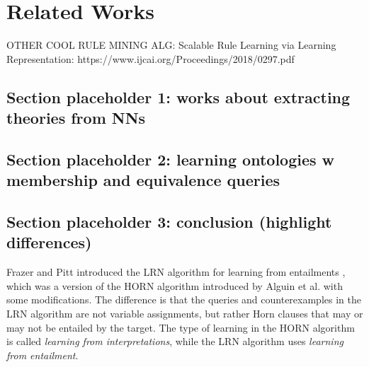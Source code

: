 \chapter{Related Works}

OTHER COOL RULE MINING ALG:
Scalable Rule Learning via Learning Representation:
https://www.ijcai.org/Proceedings/2018/0297.pdf

\section{Section placeholder 1: works about extracting theories from NNs}

\section{Section placeholder 2: learning ontologies w membership and equivalence queries}

\section{Section placeholder 3: conclusion (highlight differences)}

Frazer and Pitt introduced the LRN algorithm for learning from entailments \cite{DBLP_conf/icml/FrazierP93}, which was a version of the HORN algorithm introduced by Alguin et al. \cite{DBLP:journals/ml/AngluinFP92} with some modifications. The difference is that the queries and counterexamples in the LRN algorithm are not variable assignments, but rather Horn clauses that may or may not be entailed by the target. The type of learning in the HORN algorithm is called \emph{learning from interpretations}, while the LRN algorithm uses \emph{learning from entailment}.

